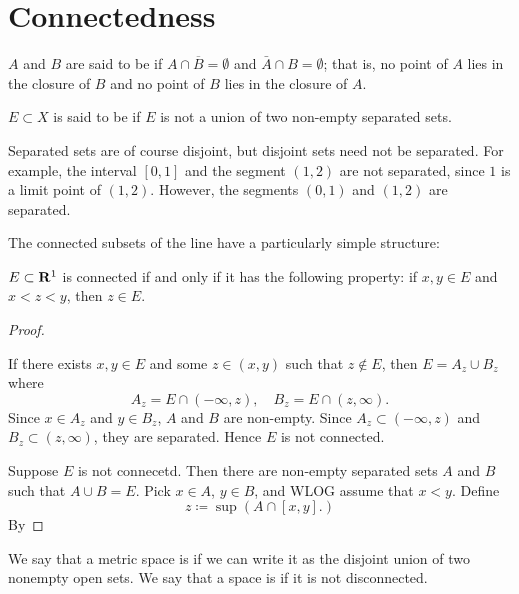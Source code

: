 \section{Connectedness}
\begin{definition}[Connectedness]
$A$ and $B$ are said to be  if $A\cap\overline{B}=\emptyset$ and $\bar{A}\cap B=\emptyset$; that is, no point of $A$ lies in the closure of $B$ and no point of $B$ lies in the closure of $A$.

$E\subset X$ is said to be  if $E$ is not a union of two non-empty separated sets. 
\end{definition}

\begin{remark}
Separated sets are of course disjoint, but disjoint sets need not be separated. For example, the interval $[0,1]$ and the segment $(1,2)$ are not separated, since $1$ is a limit point of $(1,2)$. However, the segments $(0,1)$ and $(1,2)$ are separated.
\end{remark}

The connected subsets of the line have a particularly simple structure: 

\begin{proposition}
$E\subset\mathbf R^1$ is connected if and only if it has the following property: if $x,y\in E$ and $x<z<y$, then $z\in E$.
\end{proposition}

\begin{proof} \

\fbox{$\impliedby$} If there exists $x,y\in E$ and some $z\in(x,y)$ such that $z\notin E$, then $E=A_z\cup B_z$ where
\[ A_z=E\cap(-\infty,z), \quad B_z=E\cap(z,\infty). \]
Since $x\in A_z$ and $y\in B_z$, $A$ and $B$ are non-empty. Since $A_z\subset(-\infty,z)$ and $B_z\subset(z,\infty)$, they are separated. Hence $E$ is not connected.

\fbox{$\implies$} Suppose $E$ is not connecetd. Then there are non-empty separated sets $A$ and $B$ such that $A\cup B=E$. Pick $x\in A$, $y\in B$, and WLOG assume that $x<y$. Define
\[z\coloneqq\sup(A\cap[x,y].)\]
By 
\end{proof}

\begin{definition}
We say that a metric space is  if we can write it as the disjoint union of two nonempty open sets. We say that a space is  if it is not disconnected.
\end{definition}

